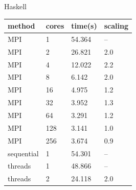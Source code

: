 \documentclass{tmr}
\begin{document}
\begin{figure}
\begin{minipage}[t]{0.5\linewidth}\centering
Haskell \\[3mm]
\begin{tabular}{|l|l|l|l|} \hline
method & cores & time(s) & scaling \\ \hline\hline
MPI & 1   & 54.364  & -- \\ \hline
MPI & 2   & 26.821  & 2.0 \\ \hline
MPI & 4   & 12.022  & 2.2 \\ \hline
MPI & 8   & 6.142   & 2.0 \\ \hline
MPI & 16  & 4.975   & 1.2 \\ \hline
MPI & 32  & 3.952   & 1.3 \\ \hline
MPI & 64  & 3.291   & 1.2 \\ \hline
MPI & 128 & 3.141   & 1.0 \\ \hline
MPI & 256 & 3.674   & 0.9 \\ \hline\hline
sequential & 1     & 54.301  & --  \\ \hline\hline
threads & 1    & 48.866  & -- \\ \hline
threads & 2    & 24.118  & 2.0 \\ \hline

\end{tabular}
\end{minipage}
\end{figure}
\end{document}

